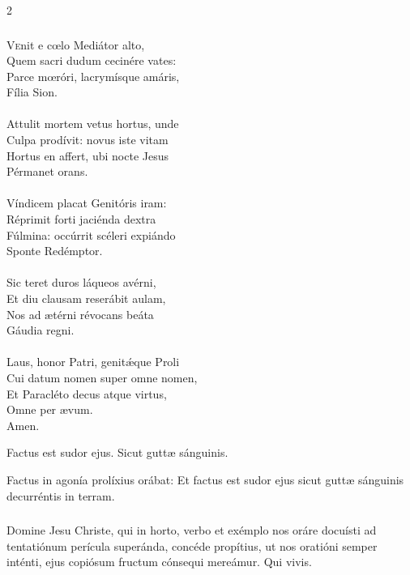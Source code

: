 \documentclass[9pt,twoside]{extarticle}
\begin{document}
\begin{multicols}{2}
\subsubsection*{\center{}}
\lettrine{V}enit e cœlo Mediátor alto,\\
Quem sacri dudum cecinére vates:\\
Parce mœróri, lacrymísque amáris,\\
Fília Sion.\\
\\
Attulit mortem vetus hortus, unde\\
Culpa prodívit: novus iste vitam\\
Hortus en affert, ubi nocte Jesus\\
Pérmanet orans.\\
\\
Víndicem placat Genitóris iram:\\
Réprimit forti jaciénda dextra\\
Fúlmina: occúrrit scéleri expiándo\\
Sponte Redémptor.\\
\\
Sic teret duros láqueos avérni,\\
Et diu clausam reserábit aulam,\\
Nos ad ætérni révocans beáta\\
Gáudia regni.\\
\\
Laus, honor Patri, genitǽque Proli\\
Cui datum nomen super omne nomen,\\
Et Paracléto decus atque virtus,\\
Omne per ævum.\\
Amen.

\begin{tightlist}{}
\item {} Factus est sudor ejus.  Sicut guttæ sánguinis.
\item {} Factus in agonía prolíxius orábat: Et factus est sudor ejus sicut guttæ sánguinis decurréntis in terram.
\end{tightlist}
\subsubsection*{\center {}}
\lettrine{D}omine Jesu Christe, qui in horto, verbo et exémplo nos oráre docuísti ad tentatiónum perícula superánda, concéde propítius, ut nos oratióni semper inténti, ejus copiósum fructum cónsequi mereámur. Qui vivis.


\end{multicols}
\end{document}
